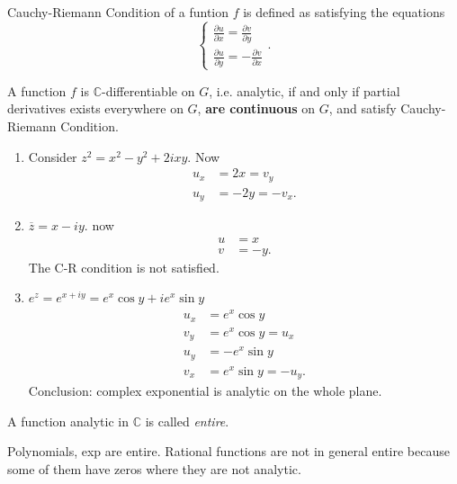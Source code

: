 \begin{theorem}
	Cauchy-Riemann Condition of a funtion $f$ is defined as satisfying the equations
	\[
		\begin{cases}
			\frac{\partial u}{\partial x} =\frac{\partial v}{\partial y} \\
			\frac{\partial u}{\partial y} =-\frac{\partial v}{\partial x} 
		\end{cases}.
	\]

	A function $f$ is $\mathbb{C}$-differentiable on $G$, i.e. analytic, if and only if partial derivatives exists everywhere on $G$, \textbf{are continuous} on $G$, and satisfy Cauchy-Riemann Condition.
\end{theorem}

\begin{example}
	\begin{enumerate}
		\item 
	Consider $z^2 = x^2-y^2+2ixy$. Now
	\begin{align*}
		u_x &=  2x = v_y \\
		u_y &= -2y = -v_x
	.\end{align*}
\item $\overline{z} = x - iy$. now
	\begin{align*}
		u &=  x\\
		v &=  -y
	.\end{align*}
	The C-R condition is not satisfied.
\item $e^z = e^{x+iy} = e^x \cos y + i e^x \sin y$ 
	\begin{align*}
		u_x &=  e^x \cos y \\
		v_y &=  e^x \cos y = u_x \\
		u_y &= -e^x \sin y \\
		v_x &= e^x \sin y = -u_y
	.\end{align*}
	Conclusion: complex exponential is analytic on the whole plane.
	\end{enumerate}
\end{example}

\begin{definition}
	A function analytic in $\mathbb{C}$ is called \textit{entire}.
\end{definition}

\begin{example}
	Polynomials, exp are entire. Rational functions are not in general entire because some of them have zeros where they are not analytic.
\end{example}

